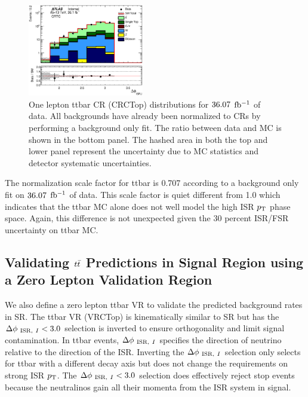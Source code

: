 \begin{figure}[htbp]
\begin{center}
        \includegraphics[width=0.45\textwidth]{figures/ttbar/postfit/CA_dphiISRI_CRTopC_log}
  \end{center}
  \caption{One lepton ttbar CR (CRCTop) distributions for $36.07$ $\mbox{fb$^{-1}$}$ of data. All backgrounds have already been normalized to CRs by performing a background only fit.  The ratio between data and MC is shown in the bottom panel. The hashed area in both the top and lower panel represent the uncertainty due to MC statistics and detector systematic uncertainties.}
  \label{fig:CRTopC}
\end{figure}

\indent The normalization scale factor for ttbar is 0.707 according to a background only fit on $36.07$ $\mbox{fb$^{-1}$}$ of data. This scale factor is quiet different from 1.0 which indicates that the ttbar MC alone does not well model the high ISR $p_{\mathrm{T}}$ phase space.  Again, this difference is not unexpected given the 30 percent ISR/FSR uncertainty on ttbar MC.  \\

\subsection{Validating $t\bar{t}$ Predictions in Signal Region using a Zero Lepton Validation Region}
\label{sec:Bkg:ttbar:VR}

\indent We also define a zero lepton ttbar VR to validate the predicted background rates in SR.  The ttbar VR (VRCTop) is kinematically similar to SR but has the $\Delta\phi_{~\mathrm{ISR},~I} < 3.0$ selection is inverted to ensure orthogonality and limit signal contamination. In ttbar events, $\Delta\phi_{~\mathrm{ISR},~I}$ specifies the direction of neutrino relative to the direction of the ISR.  Inverting the $\Delta\phi_{~\mathrm{ISR},~I}$ selection only selects for ttbar with a different decay axis but does not change the requirements on strong ISR $p_{\mathrm{T}}$.  The $\Delta\phi_{~\mathrm{ISR},~I} < 3.0$ selection does effectively reject stop events because the neutralinos gain all their momenta from the ISR system in signal. \\

